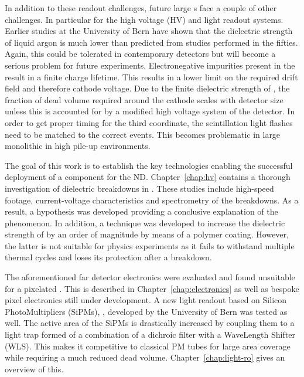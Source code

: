 In addition to these readout challenges, future large \lartpc{}s face a couple of other challenges.
In particular for the high voltage (HV) and light readout systems.
Earlier studies at the University of Bern have shown that the dielectric strength of liquid argon is much lower than predicted from studies performed in the fifties.
Again, this could be tolerated in contemporary detectors but will become a serious problem for future experiments.
Electronegative impurities present in the \lar{} result in a finite charge lifetime.
This results in a lower limit on the required drift field and therefore cathode voltage.
Due to the finite dielectric strength of \lar{}, the fraction of dead volume required around the cathode scales with detector size unless this is accounted for by a modified high voltage system of the detector.
In order to get proper timing for the third coordinate, the scintillation light flashes need to be matched to the correct events.
This becomes problematic in large monolithic \lartpc{} in high pile-up environments.

The goal of this work is to establish the key technologies enabling the successful deployment of a \lartpc{} component for the \dune{} ND.
Chapter~\ref{chap:hv} contains a thorough investigation of dielectric breakdowns in \lar{}.
These studies include high-speed footage, current-voltage characteristics and spectrometry of the breakdowns.
As a result, a hypothesis was developed providing a conclusive explanation of the phenomenon.
In addition, a technique was developed to increase the dielectric strength of \lar{} by an order of magnitude by means of a polymer coating.
However, the latter is not suitable for physics experiments as it fails to withstand multiple thermal cycles and loses its protection after a breakdown.

The aforementioned far detector electronics were evaluated and found unsuitable for a pixelated \lartpc{}.
This is described in Chapter~\ref{chap:electronics} as well as bespoke pixel electronics still under development.
A new light readout based on Silicon PhotoMultipliers (SiPMs), \AL{}, developed by the University of Bern was tested as well.
The active area of the SiPMs is drastically increased by coupling them to a light trap formed of a combination of a dichroic filter with a WaveLength Shifter (WLS).
This makes it competitive to classical PM tubes for large area coverage while requiring a much reduced dead volume.
Chapter~\ref{chap:light-ro} gives an overview of this.

